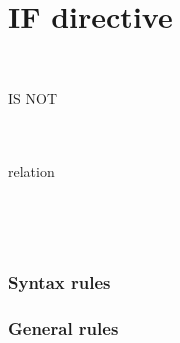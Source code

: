 \section{IF directive}

\begin{syntax}
  \begin{1=}
    \directiveindicator \\
    \miscext{\textdollar}
  \end{1=}
    IS NOT
  \begin{1=}
     \\
     \\
    relation \\
  \end{1=}

  \sourcetext


  \begin{0-1}
    \begin{1=}
      \directiveindicator \\
      \miscext{\textdollar}
    \end{1=}
     \sourcetext
  \end{0-1}

  \begin{0-1}
    \directiveindicator{} \\
  \end{0-1}
\end{syntax}

\subsubsection{Syntax rules}

\subsubsection{General rules}

